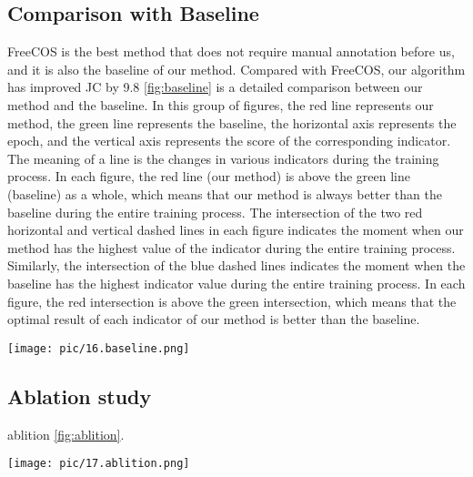 \subsection{Comparison with Baseline}

FreeCOS is the best method that does not require manual annotation before us, and it is also the baseline of our method. 
Compared with FreeCOS, our algorithm has improved JC by 9.8%
\cref{fig:baseline} is a detailed comparison between our method and the baseline. In this group of figures, the red line represents our method, the green line represents the baseline, the horizontal axis represents the epoch, and the vertical axis represents the score of the corresponding indicator. The meaning of a line is the changes in various indicators during the training process. In each figure, the red line (our method) is above the green line (baseline) as a whole, which means that our method is always better than the baseline during the entire training process. 
The intersection of the two red horizontal and vertical dashed lines in each figure indicates the moment when our method has the highest value of the indicator during the entire training process. 
Similarly, the intersection of the blue dashed lines indicates the moment when the baseline has the highest indicator value during the entire training process. 
In each figure, the red intersection is above the green intersection, 
which means that the optimal result of each indicator of our method is better than the baseline.

\begin{figure*}[htbp]
    \centering
    \texttt{[image: pic/16.baseline.png]}
    \caption{Comparison of our method with the baseline}
    \label{fig:baseline}
\end{figure*}
\subsection{Ablation study}

ablition \cref{fig:ablition}.

\begin{figure*}[htbp]
    \centering
    \texttt{[image: pic/17.ablition.png]}
    \caption{Ablation study}
    \label{fig:ablition}
\end{figure*}

